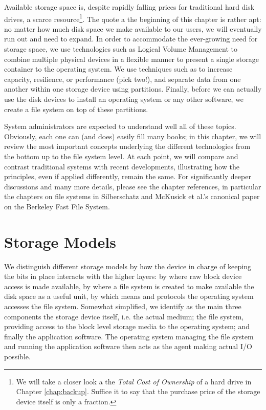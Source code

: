 Available storage space is, despite rapidly falling
prices for traditional hard disk drives, a scarce
resource\footnote{We will take a closer look a the
{\em Total Cost of Ownership} of a hard drive in Chapter
\ref{chap:backup}.  Suffice it to say that the
purchase price of the storage device itself is only a
fraction.}.  The quote a the beginning of this chapter
is rather apt: no matter how much disk space we make
available to our users, we will eventually run out and
need to expand.  In order to accommodate the
ever-growing need for storage space, we use
technologies such as Logical Volume
Management to combine
multiple physical devices in a flexible manner to
present a single storage container to the operating
system.  We use techniques such as
 to increase capacity,
resilience, or performance (pick two!), and separate
data from one another within one storage device using
partitions.  Finally, before we can actually use the
disk devices to install an operating system or any
other software, we create a file system on top of
these partitions.

System administrators are expected to understand well
all of these topics.  Obviously, each one can (and
does) easily fill many books; in this chapter, we will
review the most important concepts underlying the
different technologies from the bottom up to the file
system level.  At each point, we will compare and
contrast traditional systems with recent developments,
illustrating how the principles, even if applied
differently, remain the same.  For significantly
deeper discussions and many more details, please see
the chapter references, in particular the chapters on
file systems in
Silberschatz\cite{filesystems:silberschatz} and McKusick et al.'s canonical paper on the Berkeley Fast
File System\cite{filesystems:ffs}.


\section{Storage Models}
\label{file systems:storage-models}

We distinguish different storage models by how the
device in charge of keeping the bits in place
interacts with the higher layers: by where raw block
device access is made available, by where a file
system is created to make available the disk space as
a useful unit, by which means and protocols the
operating system accesses the file system.  Somewhat
simplified, we identify as the main three components
the storage device itself, i.e. the actual medium; the
file system, providing access to the block level
storage media to the operating system; and finally the
application software.  The operating system managing
the file system and running the application software
then acts as the agent making actual I/O possible.

